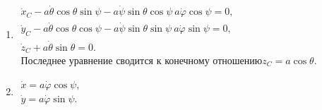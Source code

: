 \begin{enumerate}
\item $\begin{array}{ll}
	\dot{x}_C - a\dot{\theta}\cos{\theta}\sin{\psi} -
	a\dot{\psi}\sin{\theta}\cos{\psi} \ a\dot{\varphi}\cos{\psi} = 0,\\
	\dot{y}_C - a\dot{\theta}\cos{\theta}\cos{\psi} -
	a\dot{\psi}\sin{\theta}\sin{\psi} \ a\dot{\varphi}\sin{\psi} = 0,\\
	\dot{z}_C + a\dot{\theta}\sin{\theta} = 0.\\
	\mbox{Последнее уравнение сводится к конечному отношению} z_C = a\cos{\theta}.
	\end{array}$
\item $\begin{array}{ll}
	\dot{x} = a\dot{\varphi}\cos{\psi},\\
	\dot{y} = a\dot{\varphi}\sin{\psi}.
	\end{array}$
\end{enumerate}
